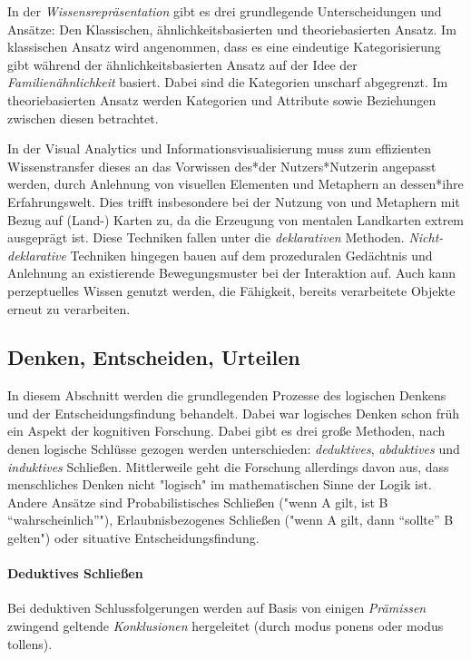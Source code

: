 			In der \emph{Wissensrepräsentation} gibt es drei grundlegende Unterscheidungen und Ansätze: Den Klassischen, ähnlichkeitsbasierten und theoriebasierten Ansatz. Im klassischen Ansatz wird angenommen, dass es eine eindeutige Kategorisierung gibt während der ähnlichkeitsbasierten Ansatz auf der Idee der \emph{Familienähnlichkeit} basiert. Dabei sind die Kategorien unscharf abgegrenzt. Im theoriebasierten Ansatz werden Kategorien und Attribute sowie Beziehungen zwischen diesen betrachtet.

			In der Visual Analytics und Informationsvisualisierung muss zum effizienten Wissenstransfer dieses an das Vorwissen des*der Nutzers*Nutzerin angepasst werden, \bspw durch Anlehnung von visuellen Elementen und Metaphern an dessen*ihre Erfahrungswelt. Dies trifft insbesondere bei der Nutzung von und Metaphern mit Bezug auf (Land-) Karten zu, da die Erzeugung von mentalen Landkarten extrem ausgeprägt ist. Diese Techniken fallen unter die \emph{deklarativen} Methoden. \emph{Nicht-deklarative} Techniken hingegen bauen auf dem prozeduralen Gedächtnis und Anlehnung an existierende Bewegungsmuster bei der Interaktion auf. Auch kann perzeptuelles Wissen genutzt werden, \dh die Fähigkeit, bereits verarbeitete Objekte erneut zu verarbeiten.

		\subsection{Denken, Entscheiden, Urteilen}
			In diesem Abschnitt werden die grundlegenden Prozesse des logischen Denkens und der Entscheidungsfindung behandelt. Dabei war logisches Denken schon früh ein Aspekt der kognitiven Forschung. Dabei gibt es drei große Methoden, nach denen logische Schlüsse gezogen werden unterschieden: \emph{deduktives}, \emph{abduktives} und \emph{induktives} Schließen. Mittlerweile geht die Forschung allerdings davon aus, dass menschliches Denken nicht "logisch" im mathematischen Sinne der Logik ist. Andere Ansätze sind \zB Probabilistisches Schließen ("wenn A gilt, ist B \enquote{wahrscheinlich}"), Erlaubnisbezogenes Schließen ("wenn A gilt, dann \enquote{sollte} B gelten") oder situative Entscheidungsfindung.

			\paragraph{Deduktives Schließen}
			Bei deduktiven Schlussfolgerungen werden auf Basis von einigen \emph{Prämissen} zwingend geltende \emph{Konklusionen} hergeleitet (\bspw durch modus ponens oder modus tollens).

